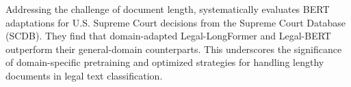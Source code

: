 \documentclass[runningheads]{llncs}
\begin{document}
Addressing the challenge of document length, \cite{Vatsal2023}
systematically evaluates BERT adaptations for U.S. Supreme Court
decisions from the Supreme Court Database (SCDB). They find that
domain-adapted Legal-LongFormer and Legal-BERT outperform their
general-domain counterparts. This underscores the significance of
domain-specific pretraining and optimized strategies for handling
lengthy documents in legal text classification. ~\cite{Shaheen2020}


\end{document}
